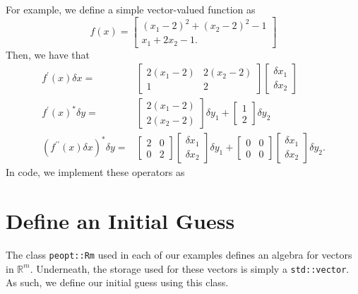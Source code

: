 \documentclass{report}
\newcommand{\re}{\mathbb{R}}
\begin{document}
        For example, we define a simple vector-valued function as
$$
    f(x)=\begin{bmatrix}
        (x_1-2)^2 + (x_2-2)^2 - 1\\
        x_1 + 2x_2 - 1.
    \end{bmatrix}
$$
Then, we have that
\begin{align*}
    f^\prime(x)\delta x=&\begin{bmatrix}
        2(x_1-2) & 2(x_2-2)\\
        1 & 2
    \end{bmatrix}\begin{bmatrix}\delta x_1\\\delta x_2\end{bmatrix}\\
    f^\prime(x)^*\delta y=&
        \begin{bmatrix}
            2(x_1-2)\\
            2(x_2-2)
        \end{bmatrix}  \delta y_1
        +
        \begin{bmatrix}
            1\\
            2
        \end{bmatrix} \delta y_2\\
    (f^{\prime\prime}(x)\delta x)^*\delta y=&
        \begin{bmatrix}
            2 & 0\\
            0 & 2
        \end{bmatrix}\begin{bmatrix}\delta x_1\\\delta x_2\end{bmatrix}
            \delta y_1
        +\begin{bmatrix}
            0 & 0\\
            0 & 0
        \end{bmatrix}\begin{bmatrix}\delta x_1\\\delta x_2\end{bmatrix}
            \delta y_2.
\end{align*}
In code, we implement these operators as


\section{Define an Initial Guess} 

        The class \texttt{peopt::Rm} used in each of our examples defines an algebra for vectors in $\re^m$.  Underneath, the storage used for these vectors is simply a \texttt{std::vector}.  As such, we define our initial guess using this class.
\end{document}
